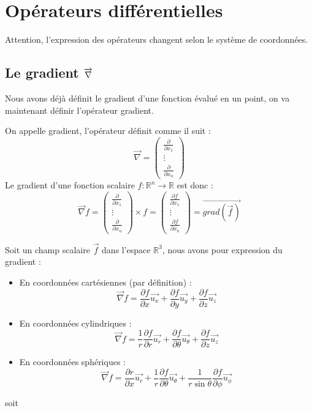 \chapter{Opérateurs différentielles}
Attention, l'expression des opérateurs changent selon le système de coordonnées.
\section{Le gradient $\protect\overrightarrow{\nabla}$}
Nous avons déjà définit le gradient d'une fonction évalué en un point, on va maintenant définir l'opérateur gradient.
\begin{defi}
On appelle gradient, l'opérateur définit comme il suit :
$$\overrightarrow{\nabla}=\begin{pmatrix}\frac{\partial}{\partial x_1}\\\vdots\\\frac{\partial}{\partial x_n}\end{pmatrix}$$
\newline
Le gradient d'une fonction scalaire $f:\mathbb{R}^n\to\mathbb{R}$ est donc :
$$\overrightarrow{\nabla}f=\begin{pmatrix}\frac{\partial}{\partial x_1}\\\vdots\\\frac{\partial}{\partial x_n}\end{pmatrix}\times f=\begin{pmatrix}\frac{\partial f}{\partial x_1}\\\vdots\\\frac{\partial f}{\partial x_n}\end{pmatrix}=\overrightarrow{grad(\overrightarrow{f})}$$
\end{defi}
\begin{prop}
Soit un champ scalaire $\overrightarrow{f}$ dans l'espace $\mathbb{R}^3$, nous avons pour expression du gradient :
\begin{itemize}
    \item En coordonnées cartésiennes (par définition) : $$\overrightarrow{\nabla}f=\frac{\partial f}{\partial x}\overrightarrow{u_x}+\frac{\partial f}{\partial y}\overrightarrow{u_y}+\frac{\partial f}{\partial z}\overrightarrow{u_z}$$
    \item En coordonnées cylindriques : $$\overrightarrow{\nabla}f=\frac{1}{r}\frac{\partial f}{\partial r}\overrightarrow{u_r}+\frac{\partial f}{\partial \theta}\overrightarrow{u_\theta}+\frac{\partial f}{\partial z}\overrightarrow{u_z}$$
    \item En coordonnées sphériques : $$\overrightarrow{\nabla}f=\frac{\partial r}{\partial x}\overrightarrow{u_r}+\frac{1}{r}\frac{\partial f}{\partial \theta}\overrightarrow{u_\theta}+\frac{1}{r\sin{\theta}}\frac{\partial f}{\partial \phi}\overrightarrow{u_\phi}$$
\end{itemize}
\end{prop}
\begin{demo}
soit
\end{demo}
